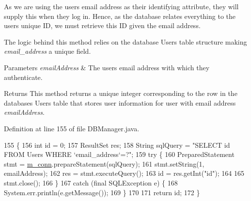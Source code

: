 As we are using the user\textquotesingle{}s email address as their identifying attribute, they will supply this when they log in. Hence, as the database relates everything to the user\textquotesingle{}s unique ID, we must retrieve this ID given the email address.

The logic behind this method relies on the database Users table structure making {\itshape email\+\_\+address} a unique field.


\begin{DoxyParams}{Parameters}
{\em email\+Address} & The user\textquotesingle{}s email address with which they authenticate.\\
\hline
\end{DoxyParams}
\begin{DoxyReturn}{Returns}
This method returns a unique integer corresponding to the row in the database\textquotesingle{}s Users table that stores user information for user with email address {\itshape email\+Address}. 
\end{DoxyReturn}


Definition at line 155 of file D\+B\+Manager.\+java.


\begin{DoxyCode}
155                                                            \{
156         \textcolor{keywordtype}{int} \textcolor{keywordtype}{id} = 0;
157         ResultSet res;
158         String sqlQuery = \textcolor{stringliteral}{"SELECT id FROM Users WHERE `email\_address`=?"};
159         \textcolor{keywordflow}{try} \{
160             PreparedStatement stmt = \mbox{\hyperlink{classcom_1_1activitytracker_1_1_d_b_manager_a064088d13ac09eb147fdc19268771521}{m\_conn}}.prepareStatement(sqlQuery);
161             stmt.setString(1, emailAddress);
162             res =  stmt.executeQuery();
163             \textcolor{keywordtype}{id} = res.getInt(\textcolor{stringliteral}{"id"});
164 
165             stmt.close();
166         \}
167         \textcolor{keywordflow}{catch} (\textcolor{keyword}{final} SQLException e) \{
168             System.err.println(e.getMessage());
169         \}
170 
171         \textcolor{keywordflow}{return} id;
172     \}
\end{DoxyCode}
\mbox{\label{classcom_1_1activitytracker_1_1_d_b_manager_aab14c61b3f3a17bdea10cab1b5fd9337}} 

